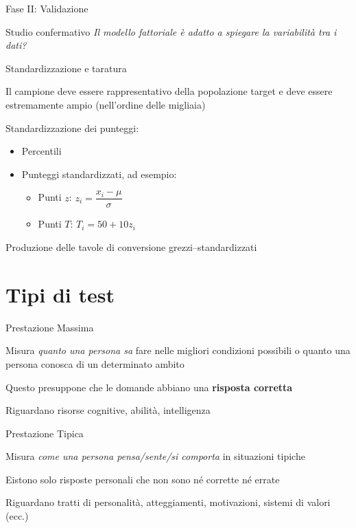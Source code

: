 \documentclass[compress]{beamer}
\begin{document}
\begin{frame}[allowframebreaks]{Fase II: Validazione}
\begin{block}{Studio confermativo}
		\bigskip
		\emph{Il modello fattoriale è adatto a spiegare la variabilità tra i dati?}
	\end{block}
	
	\begin{exampleblock}{Standardizzazione e taratura}
		
		Il campione deve essere rappresentativo della popolazione target e deve essere estremamente ampio (nell'ordine delle migliaia)
		
		Standardizzazione dei punteggi: 
		\begin{itemize}
			\item Percentili 
			\item Punteggi standardizzati, ad esempio: 
			\begin{itemize}
				\item Punti $z$: $z_i = \dfrac{x_i - \mu}{\sigma}$
				
				\bigskip
				\item Punti $T$: $T_i = 50 +10z_i$
			\end{itemize}
		\end{itemize}
		
		Produzione delle tavole di conversione grezzi--standardizzati 
	\end{exampleblock}
	
\end{frame}

\section[Tipi di Test]{Tipi di test}

\begin{frame}
	
\begin{block}{Prestazione Massima}
		
	Misura \emph{quanto una persona sa} fare nelle migliori condizioni possibili o quanto una persona conosca di un determinato ambito	
	
	Questo presuppone che le domande abbiano una \textbf{risposta corretta}
	
	Riguardano risorse cognitive, abilità, intelligenza
\end{block}

\begin{block}{Prestazione Tipica}
	
	Misura \emph{come una persona pensa/sente/si comporta} in situazioni tipiche
	
	Eistono solo risposte personali che non sono né corrette né errate
	
	Riguardano tratti di personalità, atteggiamenti, motivazioni, sistemi di valori (ecc.)
	
\end{block}
\end{frame}
\end{document}
